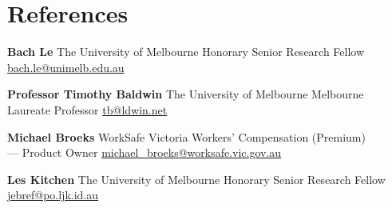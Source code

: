 \documentclass[9pt]{extarticle}
\newcommand{\reference}[5]{
    \textbf{#1} \newline
    {\footnotesize #2} \newline
    #3 \newline
    \href{mailto:#4}{#4} \newline
}
\begin{document}
\begin{minipage}[t]{.30\textwidth}
\medskip

\section{References}

\reference{Bach Le}
{The University of Melbourne}
{Honorary Senior Research Fellow}
{bach.le@unimelb.edu.au}
\vspace

\reference{Professor Timothy Baldwin}
{The University of Melbourne}
{Melbourne Laureate Professor}
{tb@ldwin.net}
\vspace

\reference{Michael Broeks}
{WorkSafe Victoria}
{Workers' Compensation (Premium) \\ --- Product Owner}
{michael\_broeks@worksafe.vic.gov.au}
\vspace

\reference{Les Kitchen}
{The University of Melbourne}
{Honorary Senior Research Fellow}
{jebref@po.ljk.id.au}
\vspace

\end{minipage}\hfill
\end{document}
